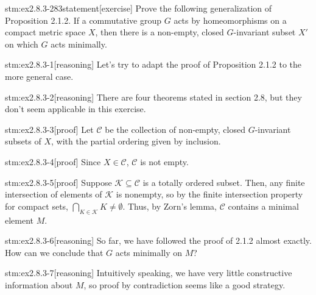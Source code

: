 
\begin{stm}{stm:ex2.8.3-283statement}[exercise]
Prove the following generalization of Proposition 2.1.2. If a commutative group $G$ acts by homeomorphisms on a compact metric space $X$, then there is a non-empty, closed $G$-invariant subset $X'$ on which $G$ acts minimally.
\end{stm}


\begin{stm}{stm:ex2.8.3-1}[reasoning]
Let's try to adapt the proof of Proposition 2.1.2 to the more general case.
\end{stm}

\begin{stm}{stm:ex2.8.3-2}[reasoning]
There are four theorems stated in section 2.8, but they don't seem applicable in this exercise.
\end{stm}

\begin{stm}{stm:ex2.8.3-3}[proof]
Let $\mathcal{C}$ be the collection of non-empty, closed $G$-invariant subsets of $X$, with the partial ordering given by inclusion.
\end{stm}

\begin{stm}{stm:ex2.8.3-4}[proof]
Since $X \in \mathcal{C}$, $\mathcal{C}$ is not empty.
\end{stm}

\begin{stm}{stm:ex2.8.3-5}[proof]
Suppose $\mathcal{K} \subseteq \mathcal{C}$ is a totally ordered subset. Then, any finite intersection of elements of $\mathcal{K}$ is nonempty, so by the finite intersection property for compact sets, $\bigcap_{K \in \mathcal{K}} K \ne \emptyset$. Thus, by Zorn's lemma, $\mathcal{C}$ contains a minimal element $M$.
\end{stm}

\begin{stm}{stm:ex2.8.3-6}[reasoning]
So far, we have followed the proof of 2.1.2 almost exactly. How can we conclude that $G$ acts minimally on $M$?
\end{stm}

\begin{stm}{stm:ex2.8.3-7}[reasoning]
Intuitively speaking, we have very little constructive information about $M$, so proof by contradiction seems like a good strategy.
\end{stm}

